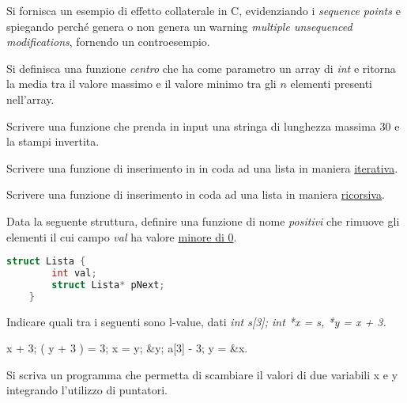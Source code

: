 \documentclass[addpoints,11pt]{exam}
\begin{document}
\begin{questions}
\question[1]
Si fornisca un esempio di effetto collaterale in C, evidenziando i \emph{sequence points} e spiegando perché genera o non genera un warning \emph{multiple unsequenced modifications}, fornendo un controesempio.
\makeemptybox{75pt}



\question[2]
Si definisca una funzione \emph{centro} che ha come parametro un array di \emph{int} e ritorna la media tra il valore massimo e il valore minimo tra gli $n$ elementi presenti nell'array.
\makeemptybox{100pt}



\question[2]
Scrivere una funzione che prenda in input una stringa di lunghezza massima 30 e la stampi invertita.
\makeemptybox{100pt}



\question[1]
Scrivere una funzione di inserimento in in coda ad una lista in maniera \underline{iterativa}.
\makeemptybox{100pt}



\question[2]
Scrivere una funzione di inserimento in coda ad una lista in maniera \underline{ricorsiva}.
\makeemptybox{100pt}



\question[4]
Data la seguente struttura, definire una funzione di nome \emph{positivi} che rimuove gli elementi il cui campo \emph{val} ha valore \underline{minore di 0}.

\begin{minipage}{0.4\linewidth}
\begin{lstlisting}[language=C]
	struct Lista {
		int val;
		struct Lista* pNext;
	}\end{lstlisting}
\end{minipage}
\begin{minipage}{0.6\linewidth}
	\makeemptybox{100pt}
\end{minipage}



\question[1]
Indicare quali tra i seguenti sono l-value, dati \emph{int s[3]; int *x = s, *y = x + 3.}

\begin{oneparcheckboxes}
	\choice x + 3;
	\choice *( y + 3 ) = 3;
	\choice *x = y;
	\choice \&y;
	\choice a[3] - 3;
	\choice y = \&x.
\end{oneparcheckboxes}



\question [1]Si scriva un programma che permetta di scambiare il valori di due variabili x e y integrando l'utilizzo di puntatori.
\makeemptybox{100pt}




\end{questions}
\end{document}
